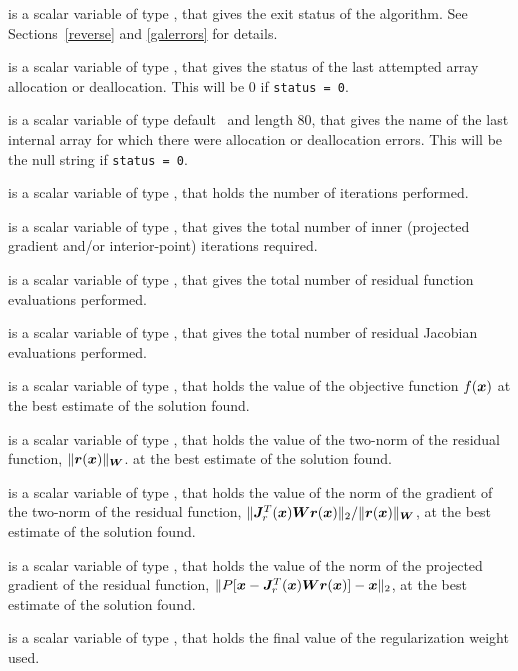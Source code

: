 \documentclass{galahad}
\begin{document}
\begin{description}
 is a scalar variable of type \integer, that gives the
exit status of the algorithm.
See Sections~\ref{reverse} and \ref{galerrors}
for details.

 is a scalar variable of type \integer, that gives
the status of the last attempted array allocation or deallocation.
This will be 0 if {\tt status = 0}.

 is a scalar variable of type default \character\
and length 80, that  gives the name of the last internal array
for which there were allocation or deallocation errors.
This will be the null string if {\tt status = 0}.

 is a scalar variable of type \integer, that holds the
number of iterations performed.

 is a scalar variable of type \integer, that gives the
total number of inner (projected gradient and/or interior-point) iterations 
required.

 is a scalar variable of type \integer, that gives the
total number of residual function evaluations performed.

 is a scalar variable of type \integer, that gives the
total number of residual Jacobian evaluations performed.

 is a scalar variable of type \realdp, that holds the
value of the objective function $f({\bm{x}})$  at the best estimate
of the solution found.

 is a scalar variable of type \realdp, that holds the
value of the two-norm of the residual function, $\|{\bm{r}}({\bm{x}})\|_{{\bm{W}}}$.
at the best estimate of the solution found.

 is a scalar variable of type \realdp, that holds the
value of the norm of the gradient of the two-norm of the residual function,
$\|{\bm{J}}_r^T({\bm{x}}) {\bm{W}} {\bm{r}}({\bm{x}})\|_2/\|{\bm{r}}({\bm{x}})\|_{{\bm{W}}}$, at the best estimate
of the solution found.

 is a scalar variable of type \realdp, that holds the
value of the norm of the projected gradient of the residual function,
$\|P[{\bm{x}} - {\bm{J}}_r^T({\bm{x}}) {\bm{W}} {\bm{r}}({\bm{x}})] - {\bm{x}}\|_2$, at the best 
estimate of the solution found.

 is a scalar variable of type \realdp, that holds the
final value of the regularization weight used.


\end{description}
\end{document}
